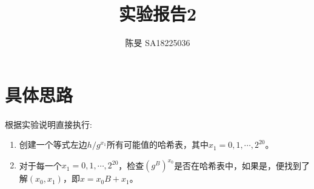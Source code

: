 \documentclass[UTF8]{article}
\title{实验报告2}
\author{陈旻 SA18225036}
\date{}
\begin{document}
\maketitle
\section{具体思路}
\paragraph{}
根据实验说明直接执行:
\begin{enumerate}[(1)]
    \item 创建一个等式左边$ h / g^{x_1} $所有可能值的哈希表，其中$ x_1 = 0,1,\cdots,2^{20} $。
    \item 对于每一个$ x_1 = 0,1,\cdots,2^{20} $，检查$ {(g^B)}^{x_0} $是否在哈希表中，如果是，便找到了解$ (x_0 , x_1) $，即$ x = x_0 B + x_1$。
\end{enumerate}
\end{document}
